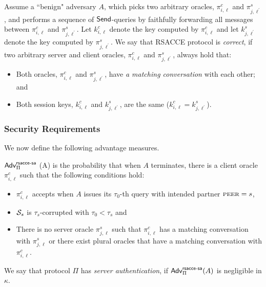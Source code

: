 \begin{definition}[Correctness]
 Assume a ``benign" adversary $A$, which picks two arbitrary oracles, $\pi^c_{i, \ell}$ and $\pi^s_{j, \ell^{\prime}}$,
 and performs a sequence of $\mathsf{Send}$-queries by faithfully forwarding all messages
 between $\pi^c_{i, \ell}$ and $\pi^s_{j, \ell^{\prime}}$.
 Let $k^c_{i, \ell}$ denote the key computed by $\pi^c_{i, \ell}$
 and let $k^s_{j, \ell^{\prime}}$ denote the key computed by $\pi^s_{j, \ell^{\prime}}$.
 We say that RSACCE protocol is \textit{correct}, if two arbitrary server and client oracles, $\pi^c_{i, \ell}$ and $\pi^s_{j, \ell^{\prime}}$, always hold that:
 \begin{itemize}
  \item{Both oracles, $\pi^c_{i, \ell}$ and $\pi^s_{j, \ell^{\prime}}$, have \textit{a matching conversation} with each other; and}
  \item{Both session keys, $k^c_{i, \ell}$ and $k^s_{j, \ell^{\prime}}$, are the same ($k^c_{i, \ell} = k^s_{j, \ell^{\prime}}$).}
 \end{itemize}
\end{definition}

\subsubsection{Security Requirements}
We now define the following advantage measures.

\begin{definition} \label{def:rsacce-sa}
 $\mathsf{Adv}^{\mathsf{rsacce\textsc{-} sa}}_{\Pi}$ (A) is the probability that when $A$ terminates, there is
 a client oracle $\pi^c_{i, \ell}$ such that the following conditions hold:
 \begin{itemize}
  \item{$\pi^c_{i, \ell}$ accepts when $A$ issues its $\tau_0$-th query with intended partner $\textsc{peer}=s$, }
  \item{$\mathcal{S}_s$ is $\tau_{s}$-corrupted with $\tau_0 < \tau_{s}$ and}
  \item{There is no server oracle $\pi^s_{j, \ell}$ such that $\pi^c_{i,\ell}$ has a matching conversation
  with $\pi^s_{j,\ell}$ or there exist plural oracles that have a matching conversation with $\pi^c_{i,\ell}$.}
 \end{itemize}
 We say that protocol $\Pi$ has \textit{server authentication}, if
 $\mathsf{Adv}^{\mathsf{rsacce\textsc{-} sa}}_{\Pi}(A)$ is negligible in $\kappa$.
\end{definition}

